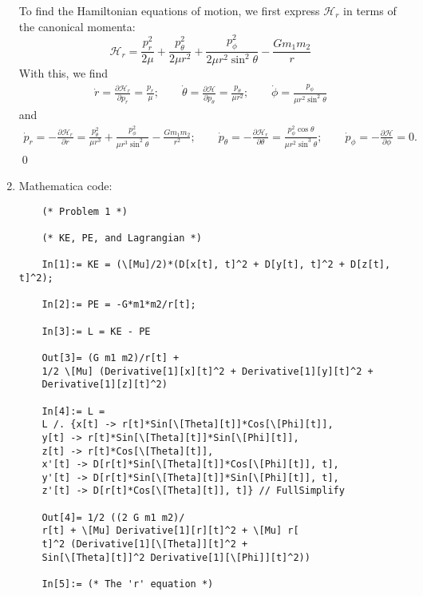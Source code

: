 \documentclass{article}
\theoremstyle{definition}
\newcommand{\p}{\partial}
\newcommand{\ham}{\mathcal{H}}
\newcommand{\f}[2]{\frac{#1}{#2}}
\begin{document}
\begin{enumerate}[label=(\alph*)]
	To find the Hamiltonian equations of motion, we first express $\ham_r$ in terms of the canonical momenta:
	\begin{equation*}
	\ham_r = \f{p_r^2}{2\mu} + \f{p_\theta^2}{2\mu r^2} + \f{p_\phi^2}{2\mu r^2\sin^2\theta} - \f{G m_1m_2}{r}
	\end{equation*}
	With this, we find
	\begin{align*}
	\dot{r} = \f{\p \ham_r }{\p p_r} = \f{p_r}{\mu}; 
	\quad\quad 
	\dot{\theta} = \f{\p \ham}{\p p_\theta} = \f{p_\theta}{\mu r^2}; 
	\quad\quad 
	\dot{\phi} = \f{p_\phi}{\mu r^2 \sin^2\theta}
	\end{align*}
	and 
	\begin{align*}
	\dot{p}_r = -\f{\p \ham_r}{\p r} = \f{p_\theta^2}{\mu r^3} + \f{p_\phi^2}{\mu r^3\sin^2\theta} - \f{Gm_1m_2}{r^2}; 
	\quad\quad 
	\dot{p}_\theta = -\f{\p\ham_r}{\p \theta}  = \f{p_\phi^2\cos\theta}{\mu r^2\sin^3\theta}; 
	\quad\quad \dot{p}_\phi = - \f{\p \ham}{\p \phi} = 0.
	\end{align*}\qed
	
	
	
	
	
	
	
	
	
	
	
	
	\item 
	Mathematica code: 
	\begin{lstlisting}
	(* Problem 1 *)
	
	(* KE, PE, and Lagrangian *)
	
	In[1]:= KE = (\[Mu]/2)*(D[x[t], t]^2 + D[y[t], t]^2 + D[z[t], t]^2);
	
	In[2]:= PE = -G*m1*m2/r[t];
	
	In[3]:= L = KE - PE
	
	Out[3]= (G m1 m2)/r[t] + 
	1/2 \[Mu] (Derivative[1][x][t]^2 + Derivative[1][y][t]^2 + 
	Derivative[1][z][t]^2)
	
	In[4]:= L = 
	L /. {x[t] -> r[t]*Sin[\[Theta][t]]*Cos[\[Phi][t]], 
	y[t] -> r[t]*Sin[\[Theta][t]]*Sin[\[Phi][t]], 
	z[t] -> r[t]*Cos[\[Theta][t]],
	x'[t] -> D[r[t]*Sin[\[Theta][t]]*Cos[\[Phi][t]], t], 
	y'[t] -> D[r[t]*Sin[\[Theta][t]]*Sin[\[Phi][t]], t], 
	z'[t] -> D[r[t]*Cos[\[Theta][t]], t]} // FullSimplify
	
	Out[4]= 1/2 ((2 G m1 m2)/
	r[t] + \[Mu] Derivative[1][r][t]^2 + \[Mu] r[
	t]^2 (Derivative[1][\[Theta]][t]^2 + 
	Sin[\[Theta][t]]^2 Derivative[1][\[Phi]][t]^2))
	
	In[5]:= (* The 'r' equation *)
	

\end{lstlisting}
\end{enumerate}
\end{document}
